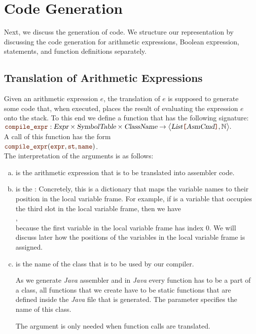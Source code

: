 \section{Code Generation}
Next, we discuss the generation of code.  We structure our representation by discussing the code generation for
arithmetic expressions, Boolean expression, statements, and function definitions separately. 

\subsection{Translation of Arithmetic Expressions}
Given an arithmetic expression $e$, the translation of $e$ is supposed to generate some code that, when
executed, places the result of evaluating the expression $e$ onto the stack.  To this end we define a function
 that has the following signature:
\\[0.2cm]
\hspace*{1.3cm}
$\mytt{compile\_expr}: \textsl{Expr} \times \textsl{SymbolTable} \times \textsl{ClassName} \rightarrow 
                 \bigl\langle\textsl{List}\mytt{[}\textsl{AsmCmd}\mytt{]}, \mathbb{N}\bigr\rangle.$
\\[0.2cm]
A call of this function has the form
\\[0.2cm]
\hspace*{1.3cm}
$\mytt{compile\_expr}(\mytt{expr}, \mytt{st}, \mytt{name})$.
\\[0.2cm]
The interpretation of the arguments is as follows:
\begin{enumerate}[(a)]
\item {} is the arithmetic expression that is to be translated into assembler code.
\item {} is the :  Concretely, this is a dictionary that maps
      the variable names to their position in the local variable frame.  For example, if  is a
      variable that occupies the third slot in the local variable frame, then we have
      \\[0.2cm]
      \hspace*{1.3cm}
      ,
      \\[0.2cm]
      because the first variable in the local variable frame has index 0.  We will discuss later how the 
      positions of the variables in the local variable frame is assigned.
\item {} is the name of the class that is to be used by our compiler.

      As we generate \textsl{Java} assembler and in \textsl{Java} every function has to be a part of a class,
      all functions that we create have to be static functions that are defined inside the \textsl{Java}
       file that is generated.  The parameter  specifies the name of this class.

      The argument  is only needed when function calls are translated.
\end{enumerate}
